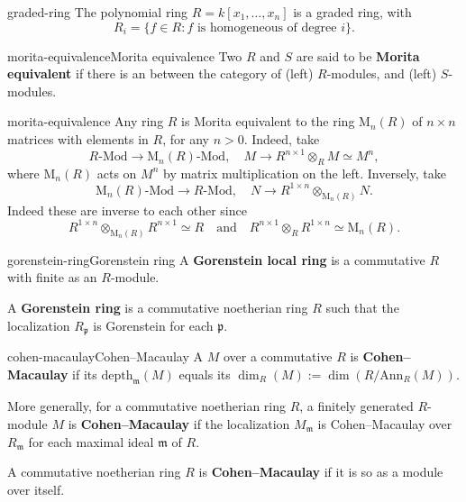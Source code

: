 \begin{example}{graded-ring}
    The polynomial ring $R = k[x_1, \ldots, x_n]$ is a graded ring, with
    \[ R_i = \{ f \in R : f \text{ is homogeneous of degree $i$} \} . \]
\end{example}

\begin{topic}{morita-equivalence}{Morita equivalence}
    Two  $R$ and $S$ are said to be \textbf{Morita equivalent} if there is an  between the category of (left) $R$-modules, and (left) $S$-modules.
\end{topic}

\begin{example}{morita-equivalence}
    Any ring $R$ is Morita equivalent to the ring $\text{M}_n(R)$ of $n \times n$ matrices with elements in $R$, for any $n > 0$. Indeed, take
    \[ R\text{-Mod} \to \text{M}_n(R)\text{-Mod}, \quad M \to R^{n \times 1} \otimes_R M \simeq M^n , \]
    where $\text{M}_n(R)$ acts on $M^n$ by matrix multiplication on the left. Inversely, take
    \[ \text{M}_n(R)\text{-Mod} \to R\text{-Mod}, \quad N \to R^{1 \times n} \otimes_{\text{M}_n(R)} N . \]
    Indeed these are inverse to each other since
    \[ R^{1 \times n} \otimes_{\text{M}_n(R)} R^{n \times 1} \simeq R \quad \text{and} \quad R^{n \times 1} \otimes_R R^{1 \times n} \simeq \text{M}_n(R) . \]
\end{example}

\begin{topic}{gorenstein-ring}{Gorenstein ring}
    A \textbf{Gorenstein local ring} is a commutative    $R$ with finite  as an $R$-module.
    
    A \textbf{Gorenstein ring} is a commutative noetherian ring $R$ such that the localization $R_\mathfrak{p}$ is Gorenstein for each  $\mathfrak{p}$.
\end{topic}

\begin{topic}{cohen-macaulay}{Cohen--Macaulay}
    A   $M$ over a commutative    $R$ is \textbf{Cohen--Macaulay} if its  $\text{depth}_{\mathfrak{m}}(M)$ equals its  $\dim_R(M) := \dim(R/\text{Ann}_R(M))$.
    
    More generally, for a commutative noetherian ring $R$, a finitely generated $R$-module $M$ is \textbf{Cohen--Macaulay} if the localization $M_\mathfrak{m}$ is Cohen--Macaulay over $R_\mathfrak{m}$ for each maximal ideal $\mathfrak{m}$ of $R$.
    
    A commutative noetherian ring $R$ is \textbf{Cohen--Macaulay} if it is so as a module over itself.
\end{topic}

